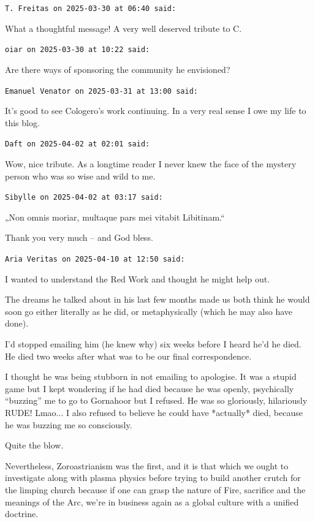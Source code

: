 \begin{footnotesize}
\begin{sffamily}
\texttt{T. Freitas on 2025-03-30 at 06:40 said:}

What a thoughtful message! A very well deserved tribute to C.

\hfill

\texttt{oiar on 2025-03-30 at 10:22 said:}

Are there ways of sponsoring the community he envisioned?

\hfill

\texttt{Emanuel Venator on 2025-03-31 at 13:00 said:}

It's good to see Cologero's work continuing. In a very real sense I owe my life to this blog.

\hfill

\texttt{Daft on 2025-04-02 at 02:01 said:}

Wow, nice tribute. As a longtime reader I never knew the face of the mystery person who was so wise and wild to me.

\hfill

\texttt{Sibylle on 2025-04-02 at 03:17 said:}

„Non omnis moriar, multaque pars mei vitabit Libitinam.``

Thank you very much -- and God bless.

\hfill

\texttt{Aria Veritas on 2025-04-10 at 12:50 said:}

I wanted to understand the Red Work and thought he might help out.

The dreams he talked about in his last few months made us both think he would soon go either literally as he did, or metaphysically (which he may also have done).

I'd stopped emailing him (he knew why) six weeks before I heard he'd he died. He died two weeks after what was to be our final correspondence.

I thought he was being stubborn in not emailing to apologise. It was a stupid game but I kept wondering if he had died because he was openly, psychically ``buzzing'' me to go to Gornahoor but I refused. He was so gloriously, hilariously RUDE! Lmao... I also refused to believe he could have *actually* died, because he was buzzing me so consciously.

Quite the blow.

Nevertheless, Zoroastrianism was the first, and it is that which we ought to investigate along with plasma physics before trying to build another crutch for the limping church because if one can grasp the nature of Fire, sacrifice and the meanings of the Arc, we're in business again as a global culture with a unified doctrine.


\end{sffamily}
\end{footnotesize}
